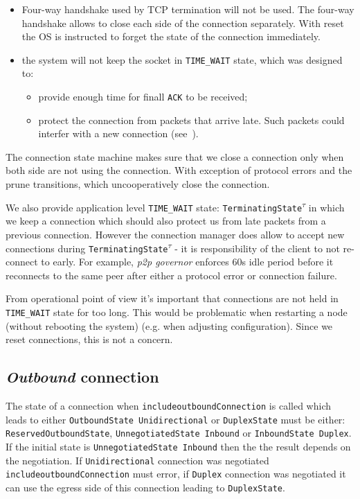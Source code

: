 \documentclass{article}
\def\TCP{\textsf{TCP}}
\def\ReservedOutboundState{\texttt{ReservedOutboundState}}
\def\UnnegotiatedStateIn{\texttt{UnnegotiatedState Inbound}}
\def\OutboundStateUni{\texttt{OutboundState\phantom{\textsuperscript{$\tau$}} Unidirectional}}
\def\DuplexState{\texttt{DuplexState}}
\def\InboundStateDup{\texttt{InboundState Duplex}}
\def\TerminatingState{\texttt{TerminatingState\textsuperscript{$\tau$}}}
\def\ptopgov{\textit{p2p governor}}
\begin{document}
\begin{itemize}
  \item Four-way handshake used by \TCP{} termination will not be used.  The
    four-way handshake allows to close each side of the connection separately.
    With reset the OS is instructed to forget the state of the connection
    immediately.
  \item the system will not keep the socket in \texttt{TIME\_WAIT} state, which
    was designed to:
    \begin{itemize}
      \item provide enough time for finall \texttt{ACK} to be received;
      \item protect the connection from packets that arrive late. Such
        packets could interfer with a new connection
        (see~\cite{stevens2003unix}).
    \end{itemize}
\end{itemize}

The connection state machine makes sure that we close a connection only when
both side are not using the connection.  With exception of protocol errors and
the prune transitions, which uncooperatively close the connection.

We also provide application level \texttt{TIME\_WAIT} state:
\TerminatingState{} in which we keep a connection which should also protect us
from late packets from a previous connection.  However the connection manager
does allow to accept new connections during \TerminatingState{} - it is
responsibility of the client to not re-connect to early.  For example,
\ptopgov{} enforces 60s idle period before it reconnects to the same peer after
either a protocol error or connection failure.

From operational point of view it's important that connections are not held in
\texttt{TIME\_WAIT} state for too long.  This would be problematic when
restarting a node (without rebooting the system) (e.g. when adjusting
configuration).  Since we reset connections, this is not a concern.


\subsection{\textit{Outbound} connection}

The state of a connection when \texttt{includeoutboundConnection} is called
which leads to either \OutboundStateUni{} or \DuplexState{} must be either:
\ReservedOutboundState{}, \UnnegotiatedStateIn{} or
\InboundStateDup{}.  If the initial state is \UnnegotiatedStateIn{} then the
the result depends on the negotiation.  If \texttt{Unidirectional} connection was
negotiated \texttt{includeoutboundConnection} must error, if \texttt{Duplex}
connection was negotiated it can use the egress side of this connection leading
to \DuplexState{}.
\end{document}
